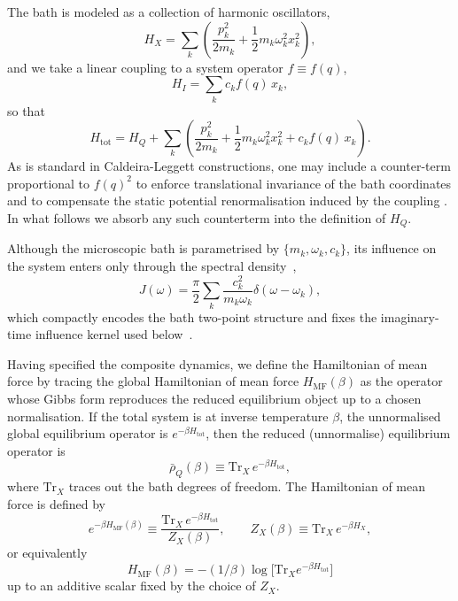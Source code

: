 ﻿\documentclass[aps,prl,twocolumn,superscriptaddress,showpacs,floatfix]{revtex4-2}
\newcommand{\Tr}{\mathrm{Tr}}
\providecommand{\DIFaddtex}[1]{{\protect\color{blue}\uwave{#1}}} %
\providecommand{\DIFaddbegin}{} %
\providecommand{\DIFaddend}{} %
\providecommand{\DIFadd}[1]{\texorpdfstring{\DIFaddtex{#1}}{#1}} %
\providecommand{\DIFaddincludegraphics}[2][]{{\color{blue}\fbox{\DIFOincludegraphics[#1]{#2}}}} %
\DeclareRobustCommand{\DIFaddbegin}{\DIFOaddbegin \let\includegraphics\DIFaddincludegraphics} %
\DeclareRobustCommand{\DIFaddend}{\DIFOaddend \let\includegraphics\DIFOincludegraphics} %
\begin{document}
The bath is model\DIFaddbegin \DIFadd{l}\DIFaddend ed as a collection of harmonic oscillators,
\begin{equation}
    H_X=\sum_k\left(\frac{p_k^2}{2m_k}+\frac{1}{2}m_k\omega_k^2 x_k^2\right),
    \label{eq:HX_model}
\end{equation}
and we take a linear coupling to a system operator $f\equiv f(q)$,
\begin{equation}
    H_I=\sum_k c_k f(q)\, x_k,
    \label{eq:HI_model}
\end{equation}
so that
\begin{equation}
    H_{\mathrm{tot}} = H_Q + \sum_k \left( \frac{p_k^2}{2m_k} + \frac{1}{2}m_k\omega_k^2 x_k^2 + c_k f(q)\, x_k \right).
    \label{eq:Htot_full}
\end{equation}
As is standard in Caldeira-Leggett constructions, one may include a counter-term
proportional to $f(q)^2$ to enforce translational invariance of the bath
coordinates and to compensate the static potential renormalisation induced by
the coupling \cite{caldeiraQuantumTunnellingDissipative1983a}. In what follows we absorb any such counterterm into the
definition of $H_Q$.

Although the microscopic bath is parametrised by $\{m_k,\omega_k,c_k\}$, its
influence on the system enters only through the spectral density~\cite{weissQuantumDissipativeSystems2012, breuerTheoryOpenQuantum2002},
\begin{equation}
    J(\omega) = \frac{\pi}{2} \sum_k \frac{c_k^2}{m_k \omega_k} \delta(\omega-\omega_k),
    \label{eq:spectral_density}
\end{equation}
which compactly encodes the bath two-point structure and fixes the imaginary-time influence kernel used below~\cite{feynmanTheoryGeneralQuantum1963a}.

Having specified the composite dynamics, we define the Hamiltonian of mean force by tracing the global Hamiltonian of mean force $H_{\mathrm{MF}}(\beta)$ as the operator whose Gibbs
form reproduces the reduced equilibrium object up to a chosen normalisation. If
the total system is at inverse temperature $\beta$, the unnormalised global
equilibrium operator is $e^{-\beta H_{\mathrm{tot}}}$, then the reduced
(unnormalise\DIFaddbegin \DIFadd{d}\DIFaddend  ) equilibrium operator is
\begin{equation}
    \bar{\rho}_Q(\beta)\equiv \Tr_X\, e^{-\beta H_{\mathrm{tot}}},
    \label{eq:reduced_equilibrium_operator}
\end{equation}
where $\Tr_X$ traces out the bath degrees of freedom. The Hamiltonian of mean
force is defined by
\begin{equation}
    e^{-\beta H_{\mathrm{MF}}(\beta)}
    \equiv
    \frac{\Tr_X\, e^{-\beta H_{\mathrm{tot}}}}{Z_X(\beta)},
    \qquad
    Z_X(\beta)\equiv \Tr_X\, e^{-\beta H_X},
    \label{eq:HMF_def}
\end{equation}
or equivalently
\begin{equation}
H_{\mathrm{MF}}(\beta)=-(1/\beta)\log\!\big[\Tr_X e^{-\beta H_{\mathrm{tot}}}\big]
\end{equation}
up to an additive scalar fixed by the choice of $Z_X$.
\end{document}
